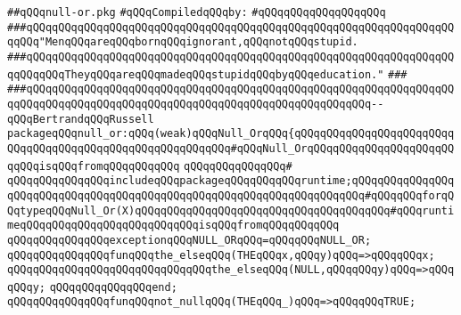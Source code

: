 \label{src/lib/std/src/null-or.pkg}
\verb|##qQQqnull-or.pkg|\newline
\newline
\verb|#qQQqCompiledqQQqby:|\newline
\verb|#qQQqqQQqqQQqqQQqqQQq|\newline
\newline
\verb|###qQQqqQQqqQQqqQQqqQQqqQQqqQQqqQQqqQQqqQQqqQQqqQQqqQQqqQQqqQQqqQQqqQQqqQQq"MenqQQqareqQQqbornqQQqignorant,qQQqnotqQQqstupid.|\newline
\verb|###qQQqqQQqqQQqqQQqqQQqqQQqqQQqqQQqqQQqqQQqqQQqqQQqqQQqqQQqqQQqqQQqqQQqqQQqqQQqTheyqQQqareqQQqmadeqQQqstupidqQQqbyqQQqeducation."|\newline
\verb|###|\newline
\verb|###qQQqqQQqqQQqqQQqqQQqqQQqqQQqqQQqqQQqqQQqqQQqqQQqqQQqqQQqqQQqqQQqqQQqqQQqqQQqqQQqqQQqqQQqqQQqqQQqqQQqqQQqqQQqqQQqqQQqqQQqqQQq--qQQqBertrandqQQqRussell|\newline
\newline
\newline
\newline
\verb|packageqQQqnull_or:qQQq(weak)qQQqNull_OrqQQq{qQQqqQQqqQQqqQQqqQQqqQQqqQQqqQQqqQQqqQQqqQQqqQQqqQQqqQQqqQQq#qQQqNull_OrqQQqqQQqqQQqqQQqqQQqqQQqqQQqisqQQqfromqQQqqQQqqQQq|\newline
\verb|qQQqqQQqqQQqqQQq#|\newline
\verb|qQQqqQQqqQQqqQQqincludeqQQqpackageqQQqqQQqqQQqruntime;qQQqqQQqqQQqqQQqqQQqqQQqqQQqqQQqqQQqqQQqqQQqqQQqqQQqqQQqqQQqqQQqqQQqqQQq#qQQqqQQqforqQQqtypeqQQqNull_Or(X)qQQqqQQqqQQqqQQqqQQqqQQqqQQqqQQqqQQqqQQq#qQQqruntimeqQQqqQQqqQQqqQQqqQQqqQQqqQQqisqQQqfromqQQqqQQqqQQq|\newline
\newline
\verb|qQQqqQQqqQQqqQQqexceptionqQQqNULL_ORqQQq=qQQqqQQqNULL_OR;|\newline
\newline
\verb|qQQqqQQqqQQqqQQqfunqQQqthe_elseqQQq(THEqQQqx,qQQqy)qQQq=>qQQqqQQqx;|\newline
\verb|qQQqqQQqqQQqqQQqqQQqqQQqqQQqqQQqthe_elseqQQq(NULL,qQQqqQQqy)qQQq=>qQQqqQQqy;|\newline
\verb|qQQqqQQqqQQqqQQqend;|\newline
\newline
\verb|qQQqqQQqqQQqqQQqfunqQQqnot_nullqQQq(THEqQQq_)qQQq=>qQQqqQQqTRUE;|\newline
